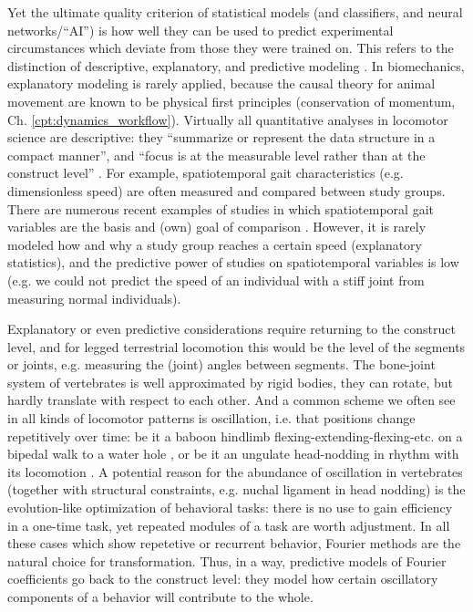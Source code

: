 Yet the ultimate quality criterion of statistical models (and classifiers, and neural networks/``AI'') is how well they can be used to predict experimental circumstances which deviate from those they were trained on.
This refers to the distinction of descriptive, explanatory, and predictive modeling \citep{Shmueli2010,Shmueli2011}.
In biomechanics, explanatory modeling is rarely applied, because the causal theory for animal movement are known to be physical first principles (conservation of momentum, Ch. \ref{cpt:dynamics_workflow}).
Virtually all quantitative analyses in locomotor science are descriptive: they ``summarize or represent the data structure in a compact manner'', and ``focus is at the measurable level rather than at the construct level'' \citep{Shmueli2010}.
For example, spatiotemporal gait characteristics (e.g. dimensionless speed) are often measured and compared between study groups.
There are numerous recent examples of studies in which spatiotemporal gait variables are the basis and (own) goal of comparison  \citep[e.g.][]{Cheu2022,Ekhator2023,Plocek2023,Young2023,Jones2023,Druelle2021,McHenry2023}.
However, it is rarely modeled how and why a study group reaches a certain speed (explanatory statistics), and the predictive power of studies on spatiotemporal variables is low (e.g. we could not predict the speed of an individual with a stiff joint from measuring normal individuals).

Explanatory or even predictive considerations require returning to the construct level, and for legged terrestrial locomotion this would be the level of the segments or joints, e.g. measuring the (joint) angles between segments.
The bone-joint system of vertebrates is well approximated by rigid bodies, they can rotate, but hardly translate with respect to each other.
And a common scheme we often see in all kinds of locomotor patterns is oscillation, i.e. that positions change repetitively over time: be it a baboon hindlimb flexing-extending-flexing-etc. on a bipedal walk to a water hole \citep{Druelle2021}, or be it an ungulate head-nodding in rhythm with its locomotion \citep{Loscher2016}.
A potential reason for the abundance of oscillation in vertebrates (together with structural constraints, e.g. nuchal ligament in head nodding) is the evolution-like optimization of behavioral tasks: there is no use to gain efficiency in a one-time task, yet repeated modules of a task are worth adjustment.
In all these cases which show repetetive or recurrent behavior, Fourier methods are the natural choice for transformation.
Thus, in a way, predictive models of Fourier coefficients go back to the construct level: they model how certain oscillatory components of a behavior will contribute to the whole.


